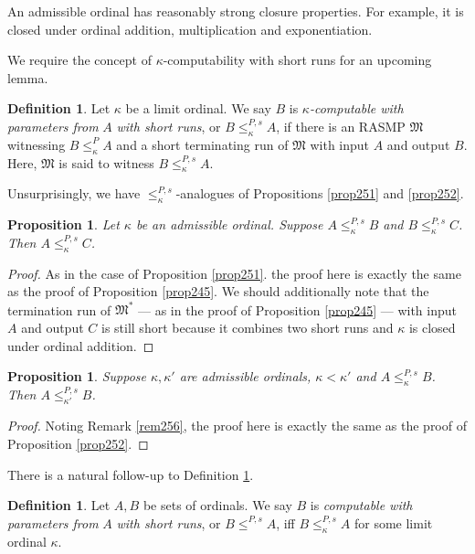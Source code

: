 \documentclass[12pt, twoside]{memoir}
\numberwithin{equation}{section}
\newtheorem{prop}[thm]{Proposition}
\theoremstyle{definition}
\newtheorem{defi}[thm]{Definition}
\theoremstyle{remark}
\theoremstyle{definition}
\theoremstyle{definition}
\theoremstyle{definition}
\theoremstyle{remark}
\begin{document}
An admissible ordinal has reasonably strong closure properties. For example, it is closed under ordinal addition, multiplication and exponentiation.

We require the concept of $\kappa$-computability with short runs for an upcoming lemma.

\begin{defi}\label{def269p}
Let $\kappa$ be a limit ordinal. We say $B$ is $\kappa$\emph{-computable with parameters from} $A$ \emph{with short runs}, or $B \leq^{P, s}_{\kappa} A$, if there is an RASMP $\mathfrak{M}$ witnessing $B \leq^P_{\kappa} A$ and a short terminating run of $\mathfrak{M}$ with input $A$ and output $B$. Here, $\mathfrak{M}$ is said to witness $B \leq^{P, s}_{\kappa} A$.
\end{defi}

Unsurprisingly, we have $\leq^{P, s}_{\kappa}$-analogues of Propositions \ref{prop251} and \ref{prop252}.

\begin{prop}\label{prop270n}
Let $\kappa$ be an admissible ordinal. Suppose $A \leq^{P, s}_{\kappa} B$ and $B \leq^{P, s}_{\kappa} C$. Then $A \leq^{P, s}_{\kappa} C$.
\end{prop}

\begin{proof}
As in the case of Proposition \ref{prop251}. the proof here is exactly the same as the proof of Proposition \ref{prop245}. We should additionally note that the termination run of $\mathfrak{M}^*$ --- as in the proof of Proposition \ref{prop245} --- with input $A$ and output $C$ is still short because it combines two short runs and $\kappa$ is closed under ordinal addition.
\end{proof}

\begin{prop}\label{prop271n}
Suppose $\kappa, \kappa'$ are admissible ordinals, $\kappa < \kappa'$ and $A \leq^{P, s}_{\kappa} B$. Then $A \leq^{P, s}_{\kappa'} B$.
\end{prop}

\begin{proof}
Noting Remark \ref{rem256}, the proof here is exactly the same as the proof of Proposition \ref{prop252}.
\end{proof}

There is a natural follow-up to Definition \ref{def269p}.

\begin{defi}
Let $A, B$ be sets of ordinals. We say $B$ is \emph{computable with parameters from} $A$ \emph{with short runs}, or $B \leq^{P, s} A$, iff $B \leq^{P, s}_{\kappa} A$ for some limit ordinal $\kappa$.
\end{defi}
\end{document}
